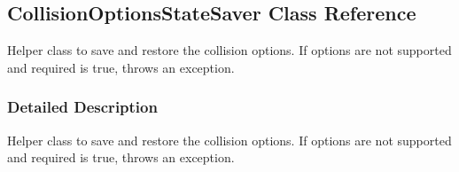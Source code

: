 \hypertarget{classOpenRAVE_1_1CollisionOptionsStateSaver}{
\subsection{CollisionOptionsStateSaver Class Reference}
\label{classOpenRAVE_1_1CollisionOptionsStateSaver}
}


Helper class to save and restore the collision options. If options are not supported and required is true, throws an exception.  




\subsubsection{Detailed Description}
Helper class to save and restore the collision options. If options are not supported and required is true, throws an exception. 